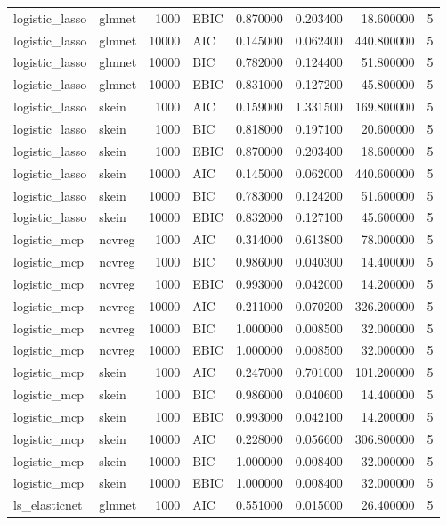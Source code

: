 \begin{table}[t]
\begin{tabular}{llrlrrrr}
logistic_lasso & glmnet & 1000 & EBIC & 0.870000 & 0.203400 & 18.600000 & 5 \\
logistic_lasso & glmnet & 10000 & AIC & 0.145000 & 0.062400 & 440.800000 & 5 \\
logistic_lasso & glmnet & 10000 & BIC & 0.782000 & 0.124400 & 51.800000 & 5 \\
logistic_lasso & glmnet & 10000 & EBIC & 0.831000 & 0.127200 & 45.800000 & 5 \\
logistic_lasso & skein & 1000 & AIC & 0.159000 & 1.331500 & 169.800000 & 5 \\
logistic_lasso & skein & 1000 & BIC & 0.818000 & 0.197100 & 20.600000 & 5 \\
logistic_lasso & skein & 1000 & EBIC & 0.870000 & 0.203400 & 18.600000 & 5 \\
logistic_lasso & skein & 10000 & AIC & 0.145000 & 0.062000 & 440.600000 & 5 \\
logistic_lasso & skein & 10000 & BIC & 0.783000 & 0.124200 & 51.600000 & 5 \\
logistic_lasso & skein & 10000 & EBIC & 0.832000 & 0.127100 & 45.600000 & 5 \\
logistic_mcp & ncvreg & 1000 & AIC & 0.314000 & 0.613800 & 78.000000 & 5 \\
logistic_mcp & ncvreg & 1000 & BIC & 0.986000 & 0.040300 & 14.400000 & 5 \\
logistic_mcp & ncvreg & 1000 & EBIC & 0.993000 & 0.042000 & 14.200000 & 5 \\
logistic_mcp & ncvreg & 10000 & AIC & 0.211000 & 0.070200 & 326.200000 & 5 \\
logistic_mcp & ncvreg & 10000 & BIC & 1.000000 & 0.008500 & 32.000000 & 5 \\
logistic_mcp & ncvreg & 10000 & EBIC & 1.000000 & 0.008500 & 32.000000 & 5 \\
logistic_mcp & skein & 1000 & AIC & 0.247000 & 0.701000 & 101.200000 & 5 \\
logistic_mcp & skein & 1000 & BIC & 0.986000 & 0.040600 & 14.400000 & 5 \\
logistic_mcp & skein & 1000 & EBIC & 0.993000 & 0.042100 & 14.200000 & 5 \\
logistic_mcp & skein & 10000 & AIC & 0.228000 & 0.056600 & 306.800000 & 5 \\
logistic_mcp & skein & 10000 & BIC & 1.000000 & 0.008400 & 32.000000 & 5 \\
logistic_mcp & skein & 10000 & EBIC & 1.000000 & 0.008400 & 32.000000 & 5 \\
ls_elasticnet & glmnet & 1000 & AIC & 0.551000 & 0.015000 & 26.400000 & 5 \\

\end{tabular}
\end{table}
